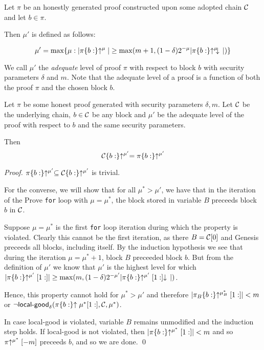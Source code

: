 \begin{definition}
Let $\pi$ be an honestly generated proof constructed upon some adopted chain
$\mathcal{C}$ and let $b \in \pi$.

Then $\mu'$ is defined as follows:

\begin{equation*}
\mu' = \max\{\mu: |\pi\{b:\}\negthickspace\uparrow^\mu| \geq \max(m + 1, (1 -
\delta)2^{-\mu}|\pi\{b:\}\negthickspace\uparrow^\mu\negthickspace\downarrow\,|)\}
\end{equation*}

We call $\mu'$ the \textit{adequate} level of proof $\pi$ with respect to
block $b$ with security parameters $\delta$ and $m$. Note that the adequate
level of a proof is a function of both the proof $\pi$ and the chosen block $b$.
\end{definition}

\begin{lemma}\label{lem.allblocks}
Let $\pi$ be some honest proof generated with security parameters $\delta, m$.
Let $\mathcal{C}$ be the underlying chain, $b \in \mathcal{C}$ be any block and $\mu'$ be
the adequate level of the proof with respect to $b$ and the same security
parameters.

Then
\begin{equation*}
\mathcal{C}\{b:\}\negthickspace\uparrow^{\mu'} = \pi\{b:\}\negthickspace\uparrow^{\mu'}
\end{equation*}
\end{lemma}
\begin{proof}
    $\pi\{b:\}\negthickspace\uparrow^{\mu'} \subseteq \mathcal{C}\{b:\}\negthickspace\uparrow^{\mu'}$ is trivial.

    For the converse, we will show that for all $\mu^* > \mu'$, we have that in
    the iteration of the Prove \texttt{for} loop with $\mu = \mu^*$, the block
    stored in variable $B$ preceeds block $b$ in $\mathcal{C}$.

    Suppose $\mu = \mu^*$ is the first \texttt{for} loop iteration during which the
    property is violated. Clearly this cannot be the first iteration, as there
    $B = \mathcal{C}[0]$ and Genesis preceeds all blocks, including itself. By the
    induction hypothesis we see that during the iteration $\mu = \mu^* + 1$,
    block $B$ preceeded block $b$. But from the definition of $\mu'$ we know
    that $\mu'$ is the highest level for which
    $|\pi\{b:\}\negthickspace\uparrow^{\mu'}[1:]|
    \geq \max(m, (1 -
    \delta)2^{-\mu'}|\pi\{b:\}\negthickspace\uparrow^{\mu'}[1:]\negthickspace\downarrow\,|)$.

    Hence, this
    property cannot hold for $\mu^* > \mu'$ and therefore
    $|\pi_B\{b:\}\negthickspace\uparrow^{\mu_B^*}[1:]| < m$ or $\lnot
    \textsf{local-good}_\delta(\pi\{b:\}\negthickspace\uparrow{\mu^*}[1:], \mathcal{C}, \mu^*)$.

    In case \textsf{local-good} is violated, variable $B$ remains unmodified and
    the induction step holds. If \textsf{local-good} is not violated, then
    $|\pi\{b:\}\negthickspace\uparrow^{\mu^*}[1:]| < m$ and so $\pi\negthickspace\uparrow^{\mu^*}[-m]$
    preceeds $b$, and so we are done.
    \qed
\end{proof}


